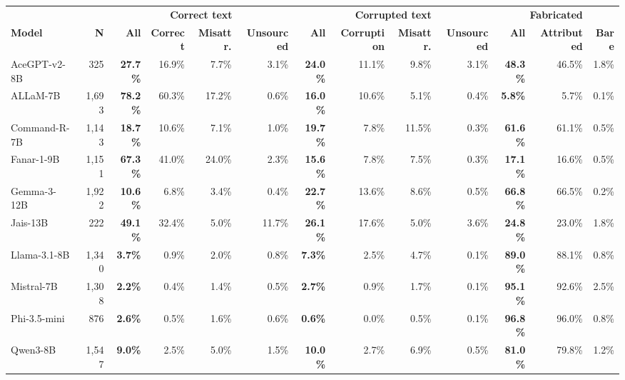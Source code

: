 \begin{table}[t]
\centering
\scriptsize
\setlength{\tabcolsep}{1.5pt}
\renewcommand{\arraystretch}{1.15}
\begin{tabular}{l r @{\hspace{6pt}} rrrr @{\hspace{6pt}} rrrr @{\hspace{6pt}} rrr}
\toprule
 &  & \multicolumn{4}{c}{\textbf{Correct text}} & \multicolumn{4}{c}{\textbf{Corrupted text}} & \multicolumn{3}{c}{\textbf{Fabricated}} \\
\cmidrule(lr){3-6}\cmidrule(lr){7-10}\cmidrule(lr){11-13}
\textbf{Model} & \textbf{N} & \textbf{All} & \textbf{Correct} & \textbf{Misattr.} & \textbf{Unsourced} & \textbf{All} & \textbf{Corruption} & \textbf{Misattr.} & \textbf{Unsourced} & \textbf{All} & \textbf{Attributed} & \textbf{Bare} \\
\midrule
AceGPT-v2-8B & 325 & \textbf{27.7\%} & 16.9\% & 7.7\% & 3.1\% & \textbf{24.0\%} & 11.1\% & 9.8\% & 3.1\% & \textbf{48.3\%} & 46.5\% & 1.8\% \\
ALLaM-7B & 1,693 & \textbf{78.2\%} & 60.3\% & 17.2\% & 0.6\% & \textbf{16.0\%} & 10.6\% & 5.1\% & 0.4\% & \textbf{5.8\%} & 5.7\% & 0.1\% \\
Command-R-7B & 1,143 & \textbf{18.7\%} & 10.6\% & 7.1\% & 1.0\% & \textbf{19.7\%} & 7.8\% & 11.5\% & 0.3\% & \textbf{61.6\%} & 61.1\% & 0.5\% \\
Fanar-1-9B & 1,151 & \textbf{67.3\%} & 41.0\% & 24.0\% & 2.3\% & \textbf{15.6\%} & 7.8\% & 7.5\% & 0.3\% & \textbf{17.1\%} & 16.6\% & 0.5\% \\
Gemma-3-12B & 1,922 & \textbf{10.6\%} & 6.8\% & 3.4\% & 0.4\% & \textbf{22.7\%} & 13.6\% & 8.6\% & 0.5\% & \textbf{66.8\%} & 66.5\% & 0.2\% \\
Jais-13B & 222 & \textbf{49.1\%} & 32.4\% & 5.0\% & 11.7\% & \textbf{26.1\%} & 17.6\% & 5.0\% & 3.6\% & \textbf{24.8\%} & 23.0\% & 1.8\% \\
Llama-3.1-8B & 1,340 & \textbf{3.7\%} & 0.9\% & 2.0\% & 0.8\% & \textbf{7.3\%} & 2.5\% & 4.7\% & 0.1\% & \textbf{89.0\%} & 88.1\% & 0.8\% \\
Mistral-7B & 1,308 & \textbf{2.2\%} & 0.4\% & 1.4\% & 0.5\% & \textbf{2.7\%} & 0.9\% & 1.7\% & 0.1\% & \textbf{95.1\%} & 92.6\% & 2.5\% \\
Phi-3.5-mini & 876 & \textbf{2.6\%} & 0.5\% & 1.6\% & 0.6\% & \textbf{0.6\%} & 0.0\% & 0.5\% & 0.1\% & \textbf{96.8\%} & 96.0\% & 0.8\% \\
Qwen3-8B & 1,547 & \textbf{9.0\%} & 2.5\% & 5.0\% & 1.5\% & \textbf{10.0\%} & 2.7\% & 6.9\% & 0.5\% & \textbf{81.0\%} & 79.8\% & 1.2\% \\

\end{tabular}
\end{table}
